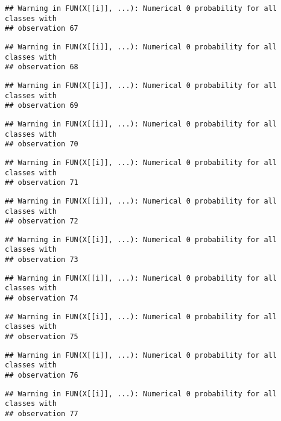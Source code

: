 \documentclass[
]{article}
\begin{document}
\begin{verbatim}
## Warning in FUN(X[[i]], ...): Numerical 0 probability for all classes with
## observation 67
\end{verbatim}

\begin{verbatim}
## Warning in FUN(X[[i]], ...): Numerical 0 probability for all classes with
## observation 68
\end{verbatim}

\begin{verbatim}
## Warning in FUN(X[[i]], ...): Numerical 0 probability for all classes with
## observation 69
\end{verbatim}

\begin{verbatim}
## Warning in FUN(X[[i]], ...): Numerical 0 probability for all classes with
## observation 70
\end{verbatim}

\begin{verbatim}
## Warning in FUN(X[[i]], ...): Numerical 0 probability for all classes with
## observation 71
\end{verbatim}

\begin{verbatim}
## Warning in FUN(X[[i]], ...): Numerical 0 probability for all classes with
## observation 72
\end{verbatim}

\begin{verbatim}
## Warning in FUN(X[[i]], ...): Numerical 0 probability for all classes with
## observation 73
\end{verbatim}

\begin{verbatim}
## Warning in FUN(X[[i]], ...): Numerical 0 probability for all classes with
## observation 74
\end{verbatim}

\begin{verbatim}
## Warning in FUN(X[[i]], ...): Numerical 0 probability for all classes with
## observation 75
\end{verbatim}

\begin{verbatim}
## Warning in FUN(X[[i]], ...): Numerical 0 probability for all classes with
## observation 76
\end{verbatim}

\begin{verbatim}
## Warning in FUN(X[[i]], ...): Numerical 0 probability for all classes with
## observation 77
\end{verbatim}
\end{document}
